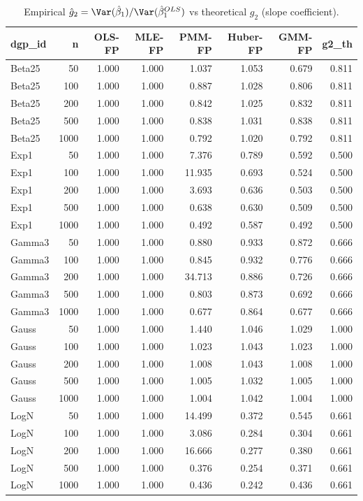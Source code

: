 \begin{table}[t]
\centering
\caption{Empirical $\hat g_2 = \Var(\hat\beta_1) / \Var(\hat\beta_1^{OLS})$ vs theoretical $g_2$ (slope coefficient).}
\label{tab:mc-are-matched}
\begin{tabular}{lrrrrrrr}
\toprule
dgp_id & n & OLS-FP & MLE-FP & PMM-FP & Huber-FP & GMM-FP & g2_th \\
\midrule
Beta25 & 50 & 1.000 & 1.000 & 1.037 & 1.053 & 0.679 & 0.811 \\
Beta25 & 100 & 1.000 & 1.000 & 0.887 & 1.028 & 0.806 & 0.811 \\
Beta25 & 200 & 1.000 & 1.000 & 0.842 & 1.025 & 0.832 & 0.811 \\
Beta25 & 500 & 1.000 & 1.000 & 0.838 & 1.031 & 0.838 & 0.811 \\
Beta25 & 1000 & 1.000 & 1.000 & 0.792 & 1.020 & 0.792 & 0.811 \\
Exp1 & 50 & 1.000 & 1.000 & 7.376 & 0.789 & 0.592 & 0.500 \\
Exp1 & 100 & 1.000 & 1.000 & 11.935 & 0.693 & 0.524 & 0.500 \\
Exp1 & 200 & 1.000 & 1.000 & 3.693 & 0.636 & 0.503 & 0.500 \\
Exp1 & 500 & 1.000 & 1.000 & 0.638 & 0.630 & 0.509 & 0.500 \\
Exp1 & 1000 & 1.000 & 1.000 & 0.492 & 0.587 & 0.492 & 0.500 \\
Gamma3 & 50 & 1.000 & 1.000 & 0.880 & 0.933 & 0.872 & 0.666 \\
Gamma3 & 100 & 1.000 & 1.000 & 0.845 & 0.932 & 0.776 & 0.666 \\
Gamma3 & 200 & 1.000 & 1.000 & 34.713 & 0.886 & 0.726 & 0.666 \\
Gamma3 & 500 & 1.000 & 1.000 & 0.803 & 0.873 & 0.692 & 0.666 \\
Gamma3 & 1000 & 1.000 & 1.000 & 0.677 & 0.864 & 0.677 & 0.666 \\
Gauss & 50 & 1.000 & 1.000 & 1.440 & 1.046 & 1.029 & 1.000 \\
Gauss & 100 & 1.000 & 1.000 & 1.023 & 1.043 & 1.023 & 1.000 \\
Gauss & 200 & 1.000 & 1.000 & 1.008 & 1.043 & 1.008 & 1.000 \\
Gauss & 500 & 1.000 & 1.000 & 1.005 & 1.032 & 1.005 & 1.000 \\
Gauss & 1000 & 1.000 & 1.000 & 1.004 & 1.042 & 1.004 & 1.000 \\
LogN & 50 & 1.000 & 1.000 & 14.499 & 0.372 & 0.545 & 0.661 \\
LogN & 100 & 1.000 & 1.000 & 3.086 & 0.284 & 0.304 & 0.661 \\
LogN & 200 & 1.000 & 1.000 & 16.666 & 0.277 & 0.380 & 0.661 \\
LogN & 500 & 1.000 & 1.000 & 0.376 & 0.254 & 0.371 & 0.661 \\
LogN & 1000 & 1.000 & 1.000 & 0.436 & 0.242 & 0.436 & 0.661 \\
\bottomrule
\end{tabular}
\end{table}
